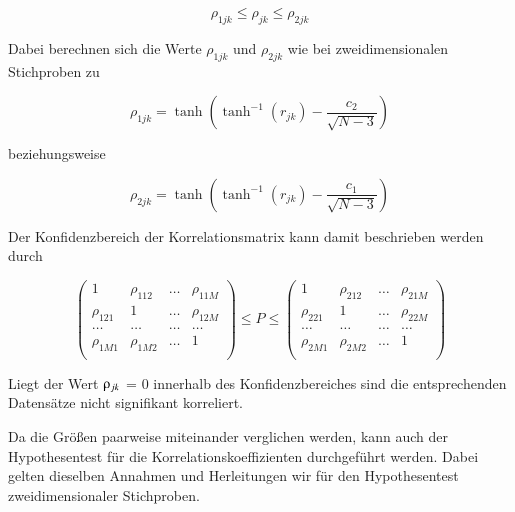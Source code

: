 \begin{equation}\label{eq:tensixtynine}
\rho _{1jk} \le \rho _{jk} \le \rho _{2jk}
\end{equation}

\noindent Dabei berechnen sich die Werte $\rho_{1jk}$ und $\rho_{2jk}$ wie bei zweidimensionalen Stichproben zu

\begin{equation}\label{eq:tenseventy}
\rho _{1jk} =\tanh \left(\tanh ^{-1} \left(r_{jk} \right)-\dfrac{c_{2} }{\sqrt{N-3} } \right)
\end{equation}

\noindent beziehungsweise

\begin{equation}\label{eq:tenseventyone}
\rho _{2jk} =\tanh \left(\tanh ^{-1} \left(r_{jk} \right)-\dfrac{c_{1} }{\sqrt{N-3} } \right)
\end{equation}

\noindent Der Konfidenzbereich der Korrelationsmatrix kann damit beschrieben werden durch

\begin{equation}\label{eq:tenseventytwo}
\begin{pmatrix}
1 & \rho _{112} & \dots & \rho _{11M}\\
\rho _{121} & 1 & \dots & \rho _{12M}\\
\dots & \dots & \dots & \dots\\
\rho _{1M1} & \rho _{1M2} & \dots & 1\\
\end{pmatrix} \le P \le
\begin{pmatrix}
1 & \rho _{212} & \dots & \rho _{21M}\\
\rho _{221} & 1 & \dots & \rho _{22M}\\
\dots & \dots & \dots & \dots\\
\rho _{2M1} & \rho _{2M2} & \dots & 1\\
\end{pmatrix}
\end{equation}

\noindent Liegt der Wert $\rhoup_{jk}$ = 0 innerhalb des Konfidenzbereiches sind die entsprechenden Datens\"{a}tze nicht signifikant korreliert.\newline

\noindent Da die Gr\"{o}{\ss}en paarweise miteinander verglichen werden, kann auch der Hypothesentest f\"{u}r die Korrelationskoeffizienten durchgef\"{u}hrt werden. Dabei gelten dieselben Annahmen und Herleitungen wir f\"{u}r den Hypothesentest zweidimensionaler Stichproben.\newline

